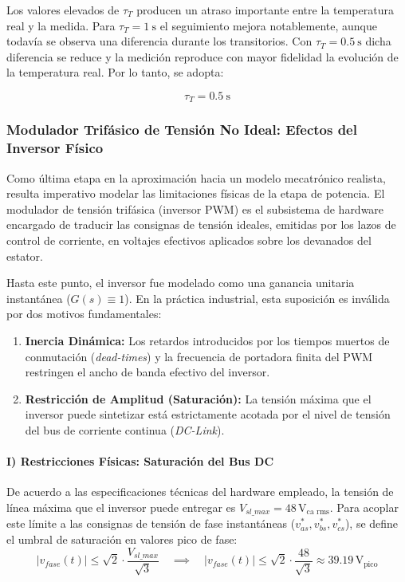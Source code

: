 \documentclass[10pt,a4paper]{article}
\begin{document}
Los valores elevados de $\tau_T$ producen un atraso importante entre la
temperatura real y la medida. Para $\tau_T=1\ \mathrm{s}$ el seguimiento
mejora notablemente, aunque todavía se observa una diferencia durante los
transitorios. Con $\tau_T=0.5\ \mathrm{s}$ dicha diferencia se reduce y la
medición reproduce con mayor fidelidad la evolución de la temperatura real.
Por lo tanto, se adopta:

\begin{equation}
	\boxed{\tau_T=0.5\ \mathrm{s}}
\end{equation}

\subsubsection{Modulador Trifásico de Tensión No Ideal: Efectos del Inversor Físico}

Como última etapa en la aproximación hacia un modelo mecatrónico realista, resulta imperativo modelar las limitaciones físicas de la etapa de potencia. El modulador de tensión trifásica (inversor PWM) es el subsistema de hardware encargado de traducir las consignas de tensión ideales, emitidas por los lazos de control de corriente, en voltajes efectivos aplicados sobre los devanados del estator.

Hasta este punto, el inversor fue modelado como una ganancia unitaria instantánea ($G(s) \equiv 1$). En la práctica industrial, esta suposición es inválida por dos motivos fundamentales:
\begin{enumerate}
    \item \textbf{Inercia Dinámica:} Los retardos introducidos por los tiempos muertos de conmutación (\textit{dead-times}) y la frecuencia de portadora finita del PWM restringen el ancho de banda efectivo del inversor.
    \item \textbf{Restricción de Amplitud (Saturación):} La tensión máxima que el inversor puede sintetizar está estrictamente acotada por el nivel de tensión del bus de corriente continua (\textit{DC-Link}).
\end{enumerate}

\paragraph{I) Restricciones Físicas: Saturación del Bus DC}
De acuerdo a las especificaciones técnicas del hardware empleado, la tensión de línea máxima que el inversor puede entregar es $V_{sl\_max} = 48\,\text{V}_{\text{ca rms}}$. Para acoplar este límite a las consignas de tensión de fase instantáneas ($v_{as}^*, v_{bs}^*, v_{cs}^*$), se define el umbral de saturación en valores pico de fase:
\begin{equation}
    |v_{fase}(t)| \leq \sqrt{2} \cdot \frac{V_{sl\_max}}{\sqrt{3}} \quad \implies \quad |v_{fase}(t)| \leq \sqrt{2} \cdot \frac{48}{\sqrt{3}} \approx 39.19\,\text{V}_{\text{pico}}
    \label{eq:saturacion_inversor}
\end{equation}
\end{document}
